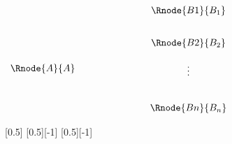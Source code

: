 $
\begin{array}{c p{2.0cm} c p{2.0cm} c}				
                   &&	 \Rnode{B1}{B_1}  \\ [0.75cm]
									 &&  \Rnode{B2}{B_2}  \\ [0.5cm]
		\Rnode{A}{A}  &&                    \\ [-0.5cm]
				           &&       \vdots      \\ [0.85cm]
                   &&	 \Rnode{Bn}{B_n}  
\end{array}
$

[0.5]
[0.5][-1]
[0.5][-1]

